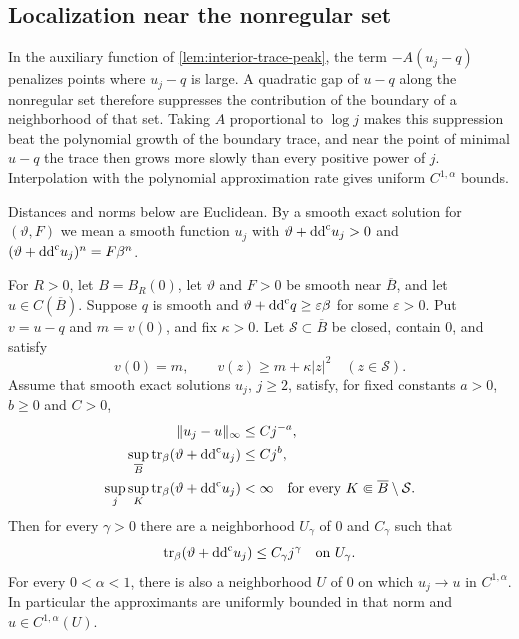 \subsection{Localization near the nonregular set}\label{sec:interior-localization}

In the auxiliary function of \cref{lem:interior-trace-peak}, the term $-A(u_j-q)$ penalizes points where $u_j-q$ is large. A quadratic gap of $u-q$ along the nonregular set therefore suppresses the contribution of the boundary of a neighborhood of that set. Taking $A$ proportional to $\log j$ makes this suppression beat the polynomial growth of the boundary trace, and near the point of minimal $u-q$ the trace then grows more slowly than every positive power of $j$. Interpolation with the polynomial approximation rate gives uniform $C^{1,\alpha}$ bounds.

Distances and norms below are Euclidean. By a smooth exact solution for $(\vartheta,F)$ we mean a smooth function $u_j$ with $\vartheta+\mathrm{dd}^{\mathrm{c}} u_j>0$ and $(\vartheta+\mathrm{dd}^{\mathrm{c}} u_j)^n=F\beta^n$.

\begin{proposition}\label{prop:interior-subpower}\label{prop:interior-uniform-c1a}
For $R>0$, let $B=B_R(0)$, let $\vartheta$ and $F>0$ be smooth near $\overline B$, and let $u\in C(\overline B)$. Suppose $q$ is smooth and $\vartheta+\mathrm{dd}^{\mathrm{c}} q\geq\varepsilon\beta$ for some $\varepsilon>0$. Put $v=u-q$ and $m=v(0)$, and fix $\kappa>0$. Let $\mathcal S\subset\overline B$ be closed, contain $0$, and satisfy
\begin{equation}\label{eq:interior-quadratic-separation}
  v(0)=m,
  \qquad
  v(z)\geq m+\kappa|z|^2\quad(z\in\mathcal S).
\end{equation}
Assume that smooth exact solutions $u_j$, $j\geq2$, satisfy, for fixed constants $a>0$, $b\geq0$ and $C>0$,
\begin{align}
  \lVert u_j-u\rVert_\infty&\leq Cj^{-a}, \label{eq:interior-localization-a}\\
  \sup_{\overline B}\operatorname{tr}_\beta(\vartheta+\mathrm{dd}^{\mathrm{c}} u_j)&\leq Cj^b, \label{eq:interior-localization-b}\\
  \sup_j\sup_K\operatorname{tr}_\beta(\vartheta+\mathrm{dd}^{\mathrm{c}} u_j)&<\infty
  \quad\text{for every }K\Subset\overline B\setminus\mathcal S. \label{eq:interior-localization-c}
\end{align}
Then for every $\gamma>0$ there are a neighborhood $U_\gamma$ of $0$ and $C_\gamma$ such that
\begin{equation}\label{eq:interior-subpower-trace}
  \operatorname{tr}_\beta(\vartheta+\mathrm{dd}^{\mathrm{c}} u_j)\leq C_\gamma j^\gamma
  \quad\text{on }U_\gamma.
\end{equation}
For every $0<\alpha<1$, there is also a neighborhood $U$ of $0$ on which $u_j\to u$ in $C^{1,\alpha}$. In particular the approximants are uniformly bounded in that norm and $u\in C^{1,\alpha}(U)$.
\end{proposition}


